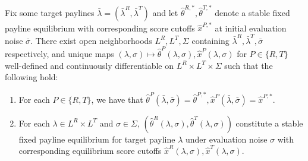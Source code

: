 \begin{lemma}\label{lemma:existence_payline_toeqm}
Fix some target paylines $\bar{\lambda} = (\bar{\lambda}^R,\bar{\lambda}^T)$ and let $\hat{\theta}^{R,*},\hat{\theta}^{T,*}$ denote a stable fixed payline equilibrium with corresponding score cutoffs $\hat{x}^{P,*}$ at initial evaluation noise $\bar{\sigma}$. There exist open neighborhoods $L^R, L^T, \Sigma$ containing $\bar{\lambda}^R,\bar{\lambda}^T,\bar{\sigma}$ respectively, and unique maps $(\lambda,\sigma)\mapsto \hat{\theta}^P(\lambda,\sigma),\hat{x}^P(\lambda,\sigma)$ for $P\in \{R,T\}$ well-defined and continuously differentiable on $L^R\times L^T\times \Sigma$ such that the following hold:
\vspace{-5pt}
\begin{enumerate}[label=(\arabic*),ref=\thelemma(\arabic*)]
  \item For each $P\in \{R,T\}$, we have that $\hat{\theta}^{P}(\bar{\lambda},\bar{\sigma}) = \hat{\theta}^{P,*}, \hat{x}^P(\bar{\lambda},\bar{\sigma}) = \hat{x}^{P,*}$.
   \item For each $\lambda\in L^R\times L^T$ and $\sigma\in \Sigma$, $(\hat{\theta}^{R}(\lambda,\sigma),\hat{\theta}^T(\lambda,\sigma))$ constitute a stable fixed payline equilibrium for target payline $\lambda$ under evaluation noise $\sigma$ with corresponding equilibrium score cutoffs $\hat{x}^R(\lambda,\sigma),\hat{x}^T(\lambda,\sigma)$. 
\end{enumerate}
\end{lemma}

